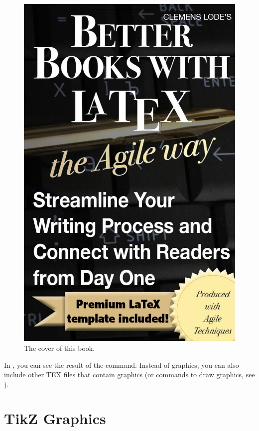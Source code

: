 \begin{figure}[!ht]
	\centering
	\includegraphics{images/cover.jpg}
	\caption{The cover of this book.}\label{fig:c1_cover}
\end{figure}

In , you can see the result of the command. Instead of
graphics, you can also include other TEX files that contain graphics (or
commands to draw graphics, see ).

\section{TikZ Graphics}\label{sec:c1_tikzgraphics}


